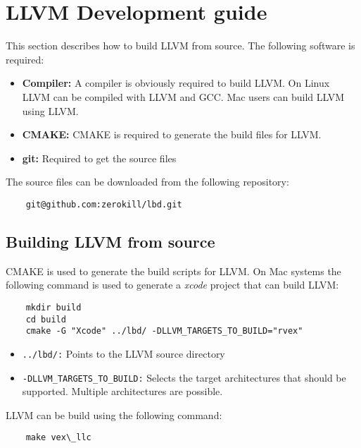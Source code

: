\chapter{LLVM Development guide}
This section describes how to build LLVM from source. The following software is required:

\begin{itemize}
	\item \textbf{Compiler:} A compiler is obviously required to build LLVM. On Linux LLVM can be compiled with LLVM and GCC. Mac users can build LLVM using LLVM.
	\item \textbf{CMAKE:} CMAKE is required to generate the build files for LLVM.
	\item \textbf{git:} Required to get the source files
\end{itemize}

The source files can be downloaded from the following repository:

\begin{lstlisting}
	git@github.com:zerokill/lbd.git
\end{lstlisting}

\section{Building LLVM from source}
CMAKE is used to generate the build scripts for LLVM. On Mac systems the following command is used to generate a \emph{xcode} project that can build LLVM:

\begin{lstlisting}
	mkdir build
	cd build
	cmake -G "Xcode" ../lbd/ -DLLVM_TARGETS_TO_BUILD="rvex"
\end{lstlisting}

\begin{itemize}
	\item \texttt{../lbd/:} Points to the LLVM source directory
	\item \texttt{-DLLVM\_TARGETS\_TO\_BUILD:} Selects the target architectures that should be supported. Multiple architectures are possible.
\end{itemize}

LLVM can be build using the following command:

\begin{lstlisting}
	make vex\_llc
\end{lstlisting}
